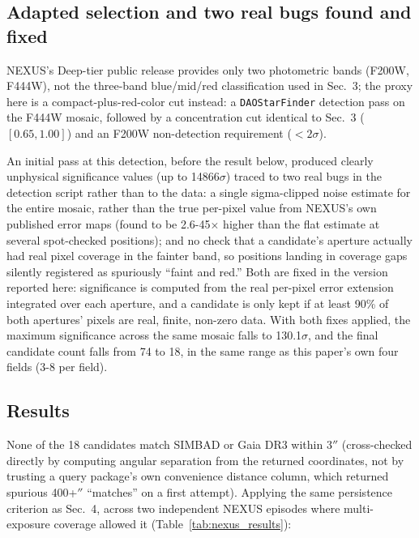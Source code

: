 \documentclass[11pt]{article}
\begin{document}
\subsection{Adapted selection and two real bugs found and fixed}

NEXUS's Deep-tier public release provides only two photometric bands (F200W,
F444W), not the three-band blue/mid/red classification used in Sec.~3; the proxy
here is a compact-plus-red-color cut instead: a \texttt{DAOStarFinder} detection
pass on the F444W mosaic, followed by a concentration cut identical to Sec.~3
($[0.65,1.00]$) and an F200W non-detection requirement ($<2\sigma$).

An initial pass at this detection, before the result below, produced clearly
unphysical significance values (up to 14866$\sigma$) traced to two real bugs in
the detection script rather than to the data: a single sigma-clipped noise
estimate for the entire mosaic, rather than the true per-pixel value from NEXUS's
own published error maps (found to be 2.6-45$\times$ higher than the flat
estimate at several spot-checked positions); and no check that a candidate's
aperture actually had real pixel coverage in the fainter band, so positions
landing in coverage gaps silently registered as spuriously ``faint and red.''
Both are fixed in the version reported here: significance is computed from the
real per-pixel error extension integrated over each aperture, and a candidate is
only kept if at least 90\% of both apertures' pixels are real, finite, non-zero
data. With both fixes applied, the maximum significance across the same mosaic
falls to 130.1$\sigma$, and the final candidate count falls from 74 to 18, in the
same range as this paper's own four fields (3-8 per field).

\subsection{Results}

None of the 18 candidates match SIMBAD or Gaia DR3 within 3$''$ (cross-checked
directly by computing angular separation from the returned coordinates, not by
trusting a query package's own convenience distance column, which returned
spurious 400+$''$ ``matches'' on a first attempt). Applying the same
persistence criterion as Sec.~4, across two independent NEXUS episodes where
multi-exposure coverage allowed it (Table~\ref{tab:nexus_results}):
\end{document}
